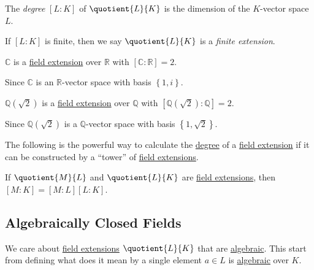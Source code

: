 \begin{definition}[Degree]\label{def:degree}
	The \emph{degree} \([L\colon K]\) of \(\quotient{L}{K} \) is the dimension of the \(K\)-vector space \(L\).
\end{definition}

\begin{notation}
	If \([L\colon K]\) is finite, then we say \(\quotient{L}{K} \) is a \emph{finite extension}.
\end{notation}

\begin{eg}
	\(\mathbb{C} \) is a \hyperref[def:field-extension]{field extension} over \(\mathbb{R} \) with \([\mathbb{C} \colon \mathbb{R} ] = 2\).
\end{eg}
\begin{explanation}
	Since \(\mathbb{C} \) is an \(\mathbb{R} \)-vector space with basis \(\left\{ 1, i \right\} \).
\end{explanation}

\begin{eg}
	\(\mathbb{Q} (\sqrt{2} )\) is a \hyperref[def:field-extension]{field extension} over \(\mathbb{Q} \) with \([\mathbb{Q}(\sqrt{2} ) \colon \mathbb{Q} ] = 2\).
\end{eg}
\begin{explanation}
	Since \(\mathbb{Q}(\sqrt{2} ) \) is a \(\mathbb{Q} \)-vector space with basis \(\left\{ 1, \sqrt{2}  \right\} \).
\end{explanation}

The following is the powerful way to calculate the \hyperref[def:degree]{degree} of a \hyperref[def:field-extension]{field extension} if it can be constructed by a ``tower'' of \hyperref[def:field-extension]{field extensions}.

\begin{theorem}\label{thm:field-tower-degree}
	If \(\quotient{M}{L} \) and \(\quotient{L}{K} \) are \hyperref[def:field-extension]{field extensions}, then \([M\colon K] = [M \colon L] [L \colon K]\).
\end{theorem}

\subsection{Algebraically Closed Fields}
We care about \hyperref[def:field-extension]{field extensions} \(\quotient{L}{K} \) that are \hyperref[def:algebraic-extension]{algebraic}. This start from defining what does it mean by a single element \(a\in L\)  is \hyperref[def:algebraic]{algebraic} over \(K\).


